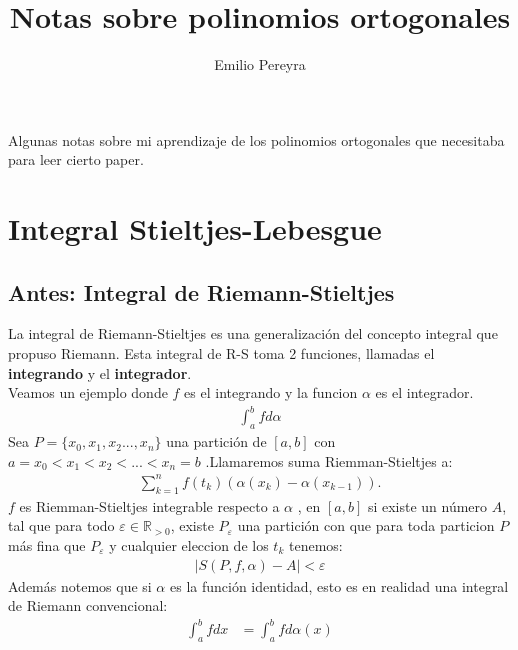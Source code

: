 \documentclass{article}
\title{Notas sobre polinomios ortogonales}
\author{Emilio Pereyra}
\begin{document}
	\begin{titlepage}
	\maketitle
	Algunas notas sobre mi aprendizaje de los polinomios ortogonales que necesitaba 
	para leer cierto paper.
	\end{titlepage}

	\section{Integral Stieltjes-Lebesgue}
	\subsection{Antes: Integral de Riemann-Stieltjes}
	\begin{flushleft}
		La integral de Riemann-Stieltjes es una generalización del concepto
		integral que propuso Riemann.
		Esta integral de R-S toma 2 funciones, llamadas el \textbf{integrando}
		y el \textbf{integrador}.\\
		Veamos un ejemplo donde $f$ es el integrando y la funcion $\alpha$ 
		es el integrador.
		\begin{equation}
			\begin{aligned}
				\int_{a}^{b}f d \alpha
			\end{aligned}
		\end{equation}
		Sea $P=\{x_0,x_1,x_2...,x_n\}$ una partición de $[a,b]$ con 
		$a=x_0<x_1<x_2<...<x_n=b$ .Llamaremos suma Riemman-Stieltjes a:
		\begin{equation}
			\begin{aligned}
				\sum_{k=1}^{n}f(t_k)( \alpha(x_{k}) -  \alpha(x_{k-1})).
			\end{aligned}
		\end{equation}
		$f$ es Riemman-Stieltjes integrable respecto a $\alpha$ ,  en $[a,b]$ si existe 
		un número $A$, tal que para todo $ \varepsilon \in \mathbb{R}_{>0}$, existe $ 
		 P_{\varepsilon}$ una partición con que para toda particion $P$ más fina que 
		 $P_{\varepsilon}$ y cualquier eleccion de los $t_{k}$ tenemos:
		 \begin{equation}
		 	\begin{aligned}
		 		|S(P,f,\alpha)-A| < \varepsilon
		 	\end{aligned}
		 \end{equation}
		 Además notemos que si $ \alpha $  es la función identidad, esto es en realidad una
		 integral de Riemann convencional:
		 \begin{equation}
		 	\begin{aligned}
				\int_{a}^{b}fdx &= \int_{a}^{b}fd \alpha(x)
			\end{aligned}
		 \end{equation}
	\end{flushleft}
\end{document}
